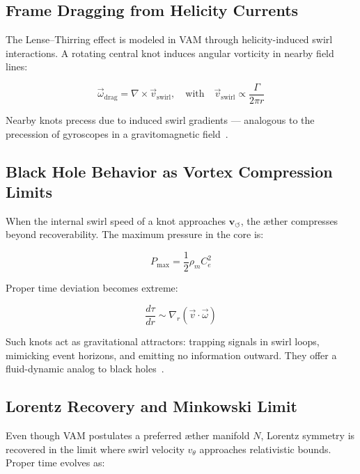 \documentclass[preprint]{revtex4-2}
\begin{document}
    \subsection{Frame Dragging from Helicity Currents}
    The Lense--Thirring effect is modeled in VAM through helicity-induced swirl interactions. A rotating central knot induces angular vorticity in nearby field lines:

    \begin{equation}
        \vec{\omega}_{\text{drag}} = \nabla \times \vec{v}_{\text{swirl}}, \quad \text{with} \quad \vec{v}_{\text{swirl}} \propto \frac{\Gamma}{2\pi r}
    \end{equation}

    Nearby knots precess due to induced swirl gradients — analogous to the precession of gyroscopes in a gravitomagnetic field~\cite{moffatt1969degree}.

    \subsection{Black Hole Behavior as Vortex Compression Limits}
    When the internal swirl speed of a knot approaches \( \mathbf{v}_{\scriptscriptstyle\boldsymbol{\circlearrowleft}} \), the æther compresses beyond recoverability. The maximum pressure in the core is:

    \begin{equation}
        P_{\text{max}} = \frac{1}{2} \rho_{\scriptscriptstyle\boldsymbol\!m} C_e^2
    \end{equation}

    Proper time deviation becomes extreme:

    \begin{equation}
        \frac{d\tau}{dr} \sim \nabla_r (\vec{v} \cdot \vec{\omega})
    \end{equation}

    Such knots act as gravitational attractors: trapping signals in swirl loops, mimicking event horizons, and emitting no information outward. They offer a fluid-dynamic analog to black holes~\cite{volovik2003universe}.

    \subsection{Lorentz Recovery and Minkowski Limit}
    Even though VAM postulates a preferred æther manifold \( N \), Lorentz symmetry is recovered in the limit where swirl velocity \( v_\theta \) approaches relativistic bounds. Proper time evolves as:
\end{document}
